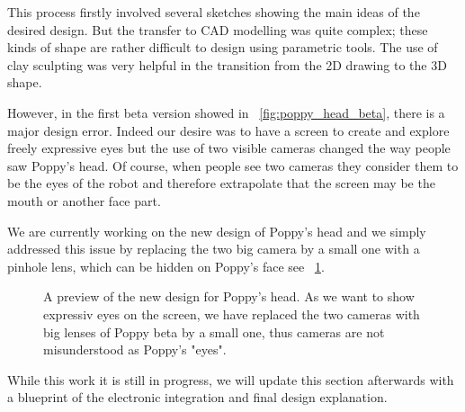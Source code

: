 This process firstly involved several sketches showing the main ideas of the desired design. But the transfer to CAD modelling was quite complex; these kinds of shape are rather difficult to design using parametric tools. The use of clay sculpting was very helpful  in the transition from the 2D drawing to the 3D shape.




However, in the first beta version showed in \figurename~\ref{fig:poppy_head_beta}, there is a major design error. Indeed our desire was to have a screen to create and explore freely expressive eyes but the use of two visible cameras changed the way people saw Poppy's head. Of course, when people see two cameras they consider them to be the eyes of the robot and therefore extrapolate that the screen may be the mouth or another face part.

We are currently working on the new design of Poppy's head and we simply addressed this issue by replacing the two big camera by a small one with a pinhole lens, which can be hidden on Poppy’s face see \figurename~\ref{fig:poppy_head_v1}.

\begin{figure}[tb]
\centering
    \caption{A preview of the new design for Poppy's head. As we want to show expressiv eyes on the screen, we have replaced the two cameras with big lenses of Poppy beta by a small one, thus cameras are not misunderstood as Poppy's "eyes". }
    \label{fig:poppy_head_v1}
\end{figure}


While this work it is still in progress, we will update this section afterwards with a blueprint of the electronic integration and final design explanation.
